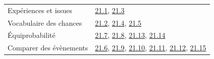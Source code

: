 \begin{tabularx}{\linewidth}{@{}Yl@{}}\toprule
Expériences et issues & \hyperref[exo-21-1]{21.1}, \hyperref[exo-21-3]{21.3}\\[2mm]
Vocabulaire des chances & \hyperref[exo-21-2]{21.2}, \hyperref[exo-21-4]{21.4}, \hyperref[exo-21-5]{21.5}\\[2mm]
Équiprobabilité & \hyperref[exo-21-7]{21.7}, \hyperref[exo-21-8]{21.8}, \hyperref[exo-21-13]{21.13}, \hyperref[exo-21-14]{21.14}\\[2mm]
Comparer des évènements & \hyperref[exo-21-6]{21.6}, \hyperref[exo-21-9]{21.9}, \hyperref[exo-21-10]{21.10}, \hyperref[exo-21-11]{21.11}, \hyperref[exo-21-12]{21.12}, \hyperref[exo-21-15]{21.15}\\[2mm]
\bottomrule\end{tabularx}\par\vspace{4mm}
\clearpage
